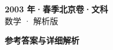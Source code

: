 \documentclass[zihao=-4, a4paper]{ctexart}
\begin{document}
\begin{center}
  {\Large\bfseries 2003 年·春季北京卷·文科}\\[4pt]
  {\large 数学 · 解析版}
\end{center}
\medskip
{}

\clearpage
{}
\begin{center}{\Large\bfseries 参考答案与详细解析}\end{center}
\medskip

\end{document}
